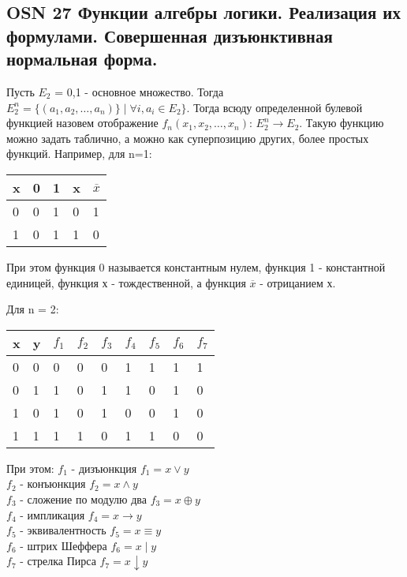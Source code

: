 \subsection*{OSN 27 Функции алгебры логики. Реализация их формулами. Совершенная дизъюнктивная нормальная форма.}

Пусть $E_{2}$ = {0,1} - основное множество. Тогда $E^n_{2} = \{(a_{1}, a_{2}, \ldots, a_{n}) \} \mid \forall i, a_{i} \in E_{2}\}$. Тогда всюду определенной булевой функцией назовем отображение $f_{n}(x_{1}, x_{2}, \ldots, x_{n})$: $E^n_{2} \rightarrow E_{2}$. Такую функцию можно задать таблично, а можно как суперпозицию других, более простых функций. Например, для n=1: \\

\begin{tabular}{ l | l l l l}
x & 0 & 1 & x & $\overline{x}$ \\
\hline
0 & 0 & 1 & 0 & 1\\
1 & 0 & 1 & 1 & 0\\
\end{tabular}


При этом функция 0 называется константным нулем, функция 1 - константной единицей, функция х - тождественной, а функция $\overline{x}$ - отрицанием х.  

Для n = 2: \\
\begin{tabular}{ l l | l l l l l l l}
x & y & $f_{1}$ & $f_{2}$ & $f_{3}$ & $f_{4}$ & $f_{5}$ & $f_{6}$ & $f_{7}$ \\
\hline
0 & 0 & 0 & 0 & 0 & 1 & 1 & 1 & 1 \\
0 & 1 & 1 & 0 & 1 & 1 & 0 & 1 & 0 \\
1 & 0 & 1 & 0 & 1 & 0 & 0 & 1 & 0 \\
1 & 1 & 1 & 1 & 0 & 1 & 1 & 0 & 0 \\
\end{tabular}

При этом: 
$f_{1}$ - дизъюнкция $f_{1} = x \vee y$\\
$f_{2}$ - конъюнкция $f_{2} = x \wedge y$ \\
$f_{3}$ - сложение по модулю два $f_{3} = x \oplus y$ \\
$f_{4}$ - импликация $f_{4} = x \rightarrow y$ \\
$f_{5}$ - эквивалентность $f_{5} = x \equiv y$\\
$f_{6}$ - штрих Шеффера $f_{6} = x \mid y$ \\
$f_{7}$ - стрелка Пирса $f_{7} = x \downarrow y$ \\

